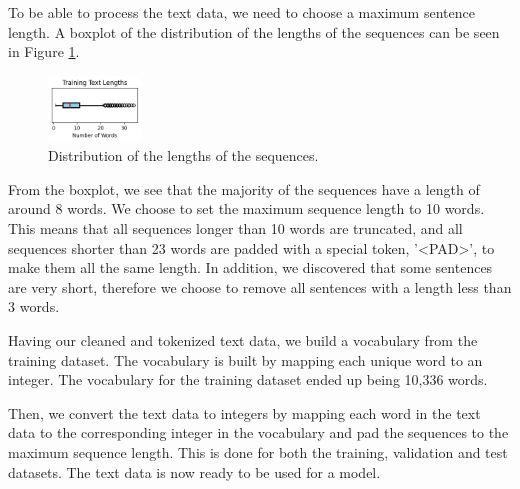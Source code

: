To be able to process the text data, we need to choose a maximum sentence length. A boxplot of the distribution of the lengths of the sequences can be seen in Figure \ref{fig:sequence_length}.
\begin{figure}[H]
    \vspace*{0.7cm}
    \centering
    \includegraphics[width=0.22\textwidth]{figures/sentence_length.png}
    \caption{Distribution of the lengths of the sequences.}
    \label{fig:sequence_length}
    \vspace*{0.7cm}
\end{figure}
From the boxplot, we see that the majority of the sequences have a length of around 8 words. We choose to set the maximum sequence length to 10 words. This means that all sequences longer than 10 words are truncated, and all sequences shorter than 23 words are padded with a special token, '<PAD>', to make them all the same length. In addition, we discovered that some sentences are very short, therefore we choose to remove all sentences with a length less than 3 words.

Having our cleaned and tokenized text data, we build a vocabulary from the training dataset. The vocabulary is built by mapping each unique word to an integer. The vocabulary for the training dataset ended up being 10,336 words.

Then, we convert the text data to integers by mapping each word in the text data to the corresponding integer in the vocabulary and pad the sequences to the maximum sequence length. This is done for both the training, validation and test datasets. The text data is now ready to be used for a model.